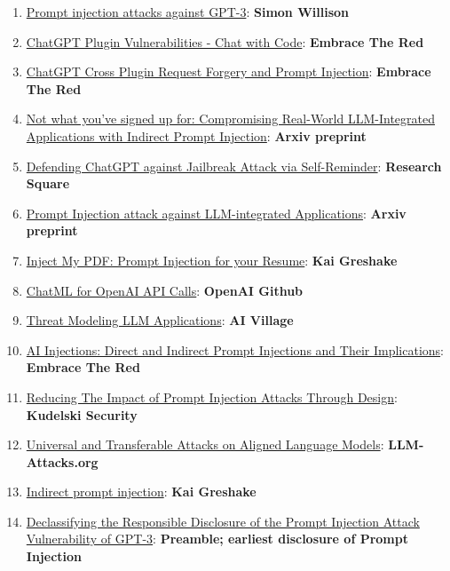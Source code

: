 \documentclass[
]{article}
\providecommand{\tightlist}{%
  \setlength{\itemsep}{0pt}\setlength{\parskip}{0pt}}
\begin{document}
\begin{enumerate}
\def\labelenumi{\arabic{enumi}.}
\tightlist
\item
  \href{https://simonwillison.net/2022/Sep/12/prompt-injection/}{Prompt
  injection attacks against GPT-3}: \textbf{Simon Willison}
\item
  \href{https://embracethered.com/blog/posts/2023/chatgpt-plugin-vulns-chat-with-code/}{ChatGPT
  Plugin Vulnerabilities - Chat with Code}: \textbf{Embrace The Red}
\item
  \href{https://embracethered.com/blog/posts/2023/chatgpt-cross-plugin-request-forgery-and-prompt-injection./}{ChatGPT
  Cross Plugin Request Forgery and Prompt Injection}: \textbf{Embrace
  The Red}
\item
  \href{https://arxiv.org/pdf/2302.12173.pdf}{Not what you've signed up
  for: Compromising Real-World LLM-Integrated Applications with Indirect
  Prompt Injection}: \textbf{Arxiv preprint}
\item
  \href{https://www.researchsquare.com/article/rs-2873090/v1}{Defending
  ChatGPT against Jailbreak Attack via Self-Reminder}: \textbf{Research
  Square}
\item
  \href{https://arxiv.org/abs/2306.05499}{Prompt Injection attack
  against LLM-integrated Applications}: \textbf{Arxiv preprint}
\item
  \href{https://kai-greshake.de/posts/inject-my-pdf/}{Inject My PDF:
  Prompt Injection for your Resume}: \textbf{Kai Greshake}
\item
  \href{https://github.com/openai/openai-python/blob/main/chatml.md}{ChatML
  for OpenAI API Calls}: \textbf{OpenAI Github}
\item
  \href{http://aivillage.org/large\%20language\%20models/threat-modeling-llm/}{Threat
  Modeling LLM Applications}: \textbf{AI Village}
\item
  \href{https://embracethered.com/blog/posts/2023/ai-injections-direct-and-indirect-prompt-injection-basics/}{AI
  Injections: Direct and Indirect Prompt Injections and Their
  Implications}: \textbf{Embrace The Red}
\item
  \href{https://research.kudelskisecurity.com/2023/05/25/reducing-the-impact-of-prompt-injection-attacks-through-design/}{Reducing
  The Impact of Prompt Injection Attacks Through Design}:
  \textbf{Kudelski Security}
\item
  \href{https://llm-attacks.org/}{Universal and Transferable Attacks on
  Aligned Language Models}: \textbf{LLM-Attacks.org}
\item
  \href{https://kai-greshake.de/posts/llm-malware/}{Indirect prompt
  injection}: \textbf{Kai Greshake}
\item
  \href{https://www.preamble.com/prompt-injection-a-critical-vulnerability-in-the-gpt-3-transformer-and-how-we-can-begin-to-solve-it}{Declassifying
  the Responsible Disclosure of the Prompt Injection Attack
  Vulnerability of GPT-3}: \textbf{Preamble; earliest disclosure of
  Prompt Injection}
\end{enumerate}
\end{document}

